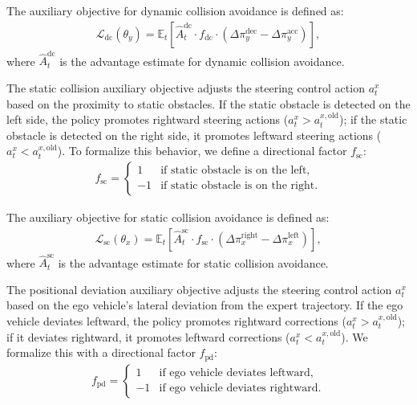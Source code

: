 The auxiliary objective for dynamic collision avoidance is defined as:
\begin{equation}
\begin{aligned}
\mathcal{L}_\text{dc}(\theta_y) = \mathbb{E}_t \left[ 
    \hat{A}_t^\text{dc} \cdot f_\text{dc} \cdot (\Delta \pi_y^{\text{dec}} - \Delta \pi_y^{\text{acc}})
\right],
\end{aligned}
\end{equation}
where \(\hat{A}_t^\text{dc}\) is the advantage estimate for dynamic collision avoidance.

The static collision auxiliary objective adjusts the steering control action $a_t^x$ based on the proximity to static obstacles. If the static obstacle is detected on the left side, the policy promotes rightward steering actions ($a_t^x > a_t^{x,\text{old}}$); if the static obstacle is detected on the right side, it promotes leftward steering actions ($a_t^x < a_t^{x,\text{old}}$). To formalize this behavior, we define a directional factor $f_\text{sc}$:  
\begin{equation}
\begin{aligned}
f_\text{sc} = \begin{cases} 
1 & \text{if static obstacle is on the left}, \\
-1 & \text{if static obstacle is on the right}.
\end{cases} 
\end{aligned}
\end{equation}

The auxiliary objective for static collision avoidance is defined as:  
\begin{equation}
\begin{aligned}
\mathcal{L}_\text{sc}(\theta_x) = \mathbb{E}_t \left[ 
    \hat{A}_t^\text{sc} \cdot f_\text{sc} \cdot (\Delta \pi_x^{\text{right}} - \Delta \pi_x^{\text{left}})
\right],
\end{aligned}
\end{equation}  
where $\hat{A}_t^\text{sc}$ is the advantage estimate for static collision avoidance.  

The positional deviation auxiliary objective adjusts the steering control action $a_t^x$ based on the ego vehicle's lateral deviation from the expert trajectory. If the ego vehicle deviates leftward, the policy promotes rightward corrections ($a_t^x > a_t^{x,\text{old}}$); if it deviates rightward, it promotes leftward corrections ($a_t^x < a_t^{x,\text{old}}$). We formalize this with a directional factor $f_\text{pd}$:  
\begin{equation}
\begin{aligned}
f_\text{pd} = \begin{cases} 
1 & \text{if ego vehicle deviates leftward}, \\
-1 & \text{if ego vehicle deviates rightward}.
\end{cases} 
\end{aligned}
\end{equation}

